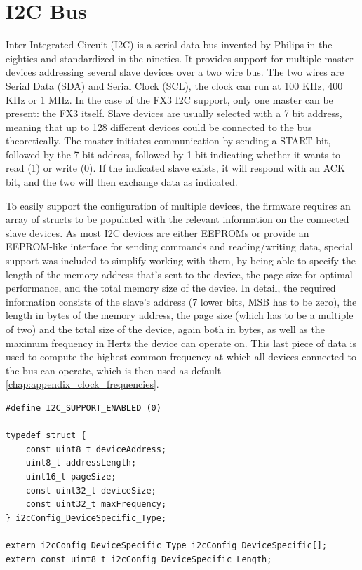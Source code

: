 \documentclass[a4paper,12pt]{report}
\begin{document}
\section{I2C Bus} \label{sec:i2c_bus}

Inter-Integrated Circuit (I2C) is a serial data bus invented by Philips in the eighties and standardized in the nineties. It provides support for multiple master devices addressing several slave devices over a two wire bus. The two wires are Serial Data (SDA) and Serial Clock (SCL), the clock can run at 100 KHz, 400 KHz or 1 MHz. In the case of the FX3 I2C support, only one master can be present: the FX3 itself. Slave devices are usually selected with a 7 bit address, meaning that up to 128 different devices could be connected to the bus theoretically. The master initiates communication by sending a START bit, followed by the 7 bit address, followed by 1 bit indicating whether it wants to read (1) or write (0). If the indicated slave exists, it will respond with an ACK bit, and the two will then exchange data as indicated.

To easily support the configuration of multiple devices, the firmware requires an array of structs to be populated with the relevant information on the connected slave devices. As most I2C devices are either EEPROMs or provide an EEPROM-like interface for sending commands and reading/writing data, special support was included to simplify working with them, by being able to specify the length of the memory address that's sent to the device, the page size for optimal performance, and the total memory size of the device.
In detail, the required information consists of the slave's address (7 lower bits, MSB has to be zero), the length in bytes of the memory address, the page size (which has to be a multiple of two) and the total size of the device, again both in bytes, as well as the maximum frequency in Hertz the device can operate on. This last piece of data is used to compute the highest common frequency at which all devices connected to the bus can operate, which is then used as default \ref{chap:appendix_clock_frequencies}.

\begin{lstlisting}
#define I2C_SUPPORT_ENABLED (0)

typedef struct {
    const uint8_t deviceAddress;
    uint8_t addressLength;
    uint16_t pageSize;
    const uint32_t deviceSize;
    const uint32_t maxFrequency;
} i2cConfig_DeviceSpecific_Type;

extern i2cConfig_DeviceSpecific_Type i2cConfig_DeviceSpecific[];
extern const uint8_t i2cConfig_DeviceSpecific_Length;
\end{lstlisting}
\end{document}
